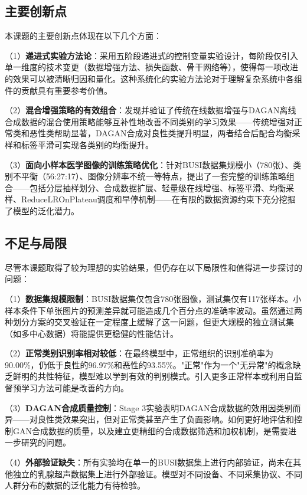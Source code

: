 \subsection{主要创新点}

本课题的主要创新点体现在以下几个方面：

（1）\textbf{递进式实验方法论}：采用五阶段递进式的控制变量实验设计，每阶段仅引入单一维度的技术变更（数据增强方法、损失函数、骨干网络等），使得每一项改进的效果可以被清晰归因和量化。这种系统化的实验方法论对于理解复杂系统中各组件的贡献具有重要参考价值。

（2）\textbf{混合增强策略的有效组合}：发现并验证了传统在线数据增强与DAGAN离线合成数据的混合使用策略能够互补性地改善不同类别的学习效果——传统增强对正常类和恶性类帮助显著，DAGAN合成对良性类提升明显，两者结合后配合均衡采样和标签平滑可实现各类别的均衡提升。

（3）\textbf{面向小样本医学图像的训练策略优化}：针对BUSI数据集规模小（780张）、类别不平衡（56:27:17）、图像分辨率不统一等特点，提出了一套完整的训练策略组合——包括分层抽样划分、合成数据扩展、轻量级在线增强、标签平滑、均衡采样、ReduceLROnPlateau调度和早停机制——在有限的数据资源约束下充分挖掘了模型的泛化潜力。


\subsection{不足与局限}

尽管本课题取得了较为理想的实验结果，但仍存在以下局限性和值得进一步探讨的问题：

（1）\textbf{数据集规模限制}：BUSI数据集仅包含780张图像，测试集仅有117张样本。小样本条件下单张图片的预测差异就可能造成几个百分点的准确率波动。虽然通过两种划分方案的交叉验证在一定程度上缓解了这一问题，但更大规模的独立测试集（如多中心数据）将能提供更稳健的性能估计。

（2）\textbf{正常类别识别率相对较低}：在最终模型中，正常组织的识别准确率为90.00\%，仍低于良性的96.97\%和恶性的93.55\%。"正常"作为一个"无异常"的概念缺乏鲜明的共性特征，模型难以学到有效的判别模式。引入更多正常样本或利用自监督预学习方法可能是改善的方向。

（3）\textbf{DAGAN合成质量控制}：Stage 3实验表明DAGAN合成数据的效用因类别而异——对良性类效果突出，但对正常类甚至产生了负面影响。如何更好地评估和控制GAN合成数据的质量，以及建立更精细的合成数据筛选和加权机制，是需要进一步研究的问题。

（4）\textbf{外部验证缺失}：所有实验均在单一的BUSI数据集上进行内部验证，尚未在其他独立的乳腺超声数据集上进行外部验证。模型对不同设备、不同采集协议、不同人群分布的数据的泛化能力有待检验。

